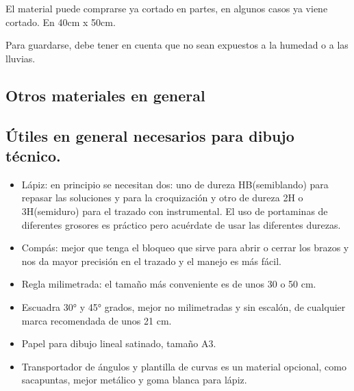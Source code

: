 El material puede comprarse ya cortado en partes, en algunos casos ya viene cortado. En 40cm x 50cm.

Para guardarse, debe tener en cuenta que no sean expuestos a la humedad o a las lluvias.

\subsection{Otros materiales en general}
\subsection{Útiles en general necesarios para dibujo técnico.}
\begin{itemize}
    \item Lápiz: en principio se necesitan dos: uno de dureza HB(semiblando) para repasar las soluciones y para la croquización y otro de dureza 2H o
3H(semiduro) para el trazado con instrumental. El uso de portaminas de
diferentes grosores es práctico pero acuérdate de usar las diferentes durezas.
\item Compás: mejor que tenga el bloqueo que sirve para abrir o cerrar los brazos y nos da mayor precisión en el trazado y el manejo es más fácil.
\item Regla milimetrada: el tamaño más conveniente es de unos 30 o 50 cm.

\item Escuadra 30° y 45° grados, mejor no milimetradas y sin escalón,  de cualquier marca
recomendada de unos 21 cm.

\item Papel para dibujo lineal satinado, tamaño A3.
\item Transportador de ángulos y plantilla de curvas es un material opcional, como sacapuntas, mejor metálico y goma blanca para lápiz.
\end{itemize}












